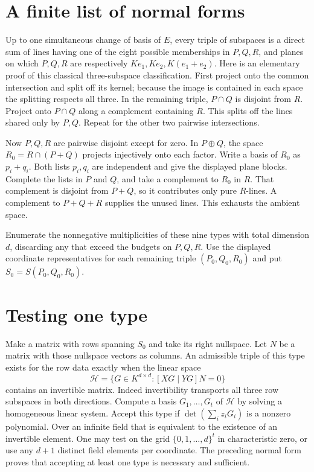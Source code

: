 \documentclass[11pt]{article}
\begin{document}
\section*{A finite list of normal forms}
Up to one simultaneous change of basis of $E$, every triple of subspaces is a direct sum of lines having one of the eight possible memberships in $P,Q,R$, and planes on which $P,Q,R$ are respectively $Ke_1,Ke_2,K(e_1+e_2)$. Here is an elementary proof of this classical three-subspace classification. First project onto the common intersection and split off its kernel; because the image is contained in each space the splitting respects all three. In the remaining triple, $P\cap Q$ is disjoint from $R$. Project onto $P\cap Q$ along a complement containing $R$. This splits off the lines shared only by $P,Q$. Repeat for the other two pairwise intersections.

Now $P,Q,R$ are pairwise disjoint except for zero. In $P\oplus Q$, the space $R_0=R\cap(P+Q)$ projects injectively onto each factor. Write a basis of $R_0$ as $p_i+q_i$. Both lists $p_i,q_i$ are independent and give the displayed plane blocks. Complete the lists in $P$ and $Q$, and take a complement to $R_0$ in $R$. That complement is disjoint from $P+Q$, so it contributes only pure $R$-lines. A complement to $P+Q+R$ supplies the unused lines. This exhausts the ambient space.

Enumerate the nonnegative multiplicities of these nine types with total dimension $d$, discarding any that exceed the budgets on $P,Q,R$. Use the displayed coordinate representatives for each remaining triple $(P_0,Q_0,R_0)$ and put $S_0=S(P_0,Q_0,R_0)$.

\section*{Testing one type}
Make a matrix with rows spanning $S_0$ and take its right nullspace. Let $N$ be a matrix with those nullspace vectors as columns. An admissible triple of this type exists for the row data exactly when the linear space
\[
 \mathcal H=\{G\in K^{d\times d}:[XG\mid YG]N=0\}
\]
contains an invertible matrix. Indeed invertibility transports all three row subspaces in both directions. Compute a basis $G_1,\ldots,G_t$ of $\mathcal H$ by solving a homogeneous linear system. Accept this type if $\det(\sum_i z_iG_i)$ is a nonzero polynomial. Over an infinite field that is equivalent to the existence of an invertible element. One may test on the grid $\{0,1,\ldots,d\}^t$ in characteristic zero, or use any $d+1$ distinct field elements per coordinate. The preceding normal form proves that accepting at least one type is necessary and sufficient.
\end{document}
